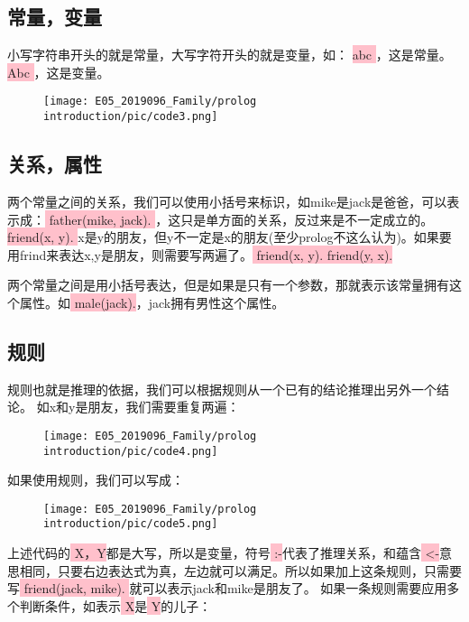 \documentclass[a4paper, 11pt]{article}
\begin{document}
\subsection{常量，变量}
小写字符串开头的就是常量，大写字符开头的就是变量，如：
\colorbox{pink}{\color{black} abc }，这是常量。
\colorbox{pink}{\color{black} Abc }，这是变量。
\begin{figure}[ht]
\centering
\texttt{[image: E05\_2019096\_Family/prolog introduction/pic/code3.png]}
\label{fig:label}
\end{figure}

\subsection{关系，属性}
两个常量之间的关系，我们可以使用小括号来标识，如mike是jack是爸爸，可以表示成：\colorbox{pink}{\color{black} father(mike, jack). }，这只是单方面的关系，反过来是不一定成立的。\colorbox{pink}{\color{black} friend(x, y). }x是y的朋友，但y不一定是x的朋友(至少prolog不这么认为)。如果要用frind来表达x,y是朋友，则需要写两遍了。\colorbox{pink}{\color{black} friend(x, y). friend(y, x). }

两个常量之间是用小括号表达，但是如果是只有一个参数，那就表示该常量拥有这个属性。如\colorbox{pink}{\color{black} male(jack).}，jack拥有男性这个属性。

\subsection{规则}
规则也就是推理的依据，我们可以根据规则从一个已有的结论推理出另外一个结论。
如x和y是朋友，我们需要重复两遍：
\begin{figure}[ht]
\centering
\texttt{[image: E05\_2019096\_Family/prolog introduction/pic/code4.png]}
\label{fig:label}
\end{figure}

如果使用规则，我们可以写成：

\begin{figure}[ht]
\centering
\texttt{[image: E05\_2019096\_Family/prolog introduction/pic/code5.png]}
\label{fig:label}
\end{figure}


上述代码的\colorbox{pink}{\color{black} X，Y}都是大写，所以是变量，符号\colorbox{pink}{\color{black} :-}代表了推理关系，和蕴含\colorbox{pink}{\color{black} <-}意思相同，只要右边表达式为真，左边就可以满足。所以如果加上这条规则，只需要写\colorbox{pink}{\color{black} friend(jack, mike). }就可以表示jack和mike是朋友了。
如果一条规则需要应用多个判断条件，如表示\colorbox{pink}{\color{black} X}是\colorbox{pink}{\color{black} Y}的儿子：
\end{document}
